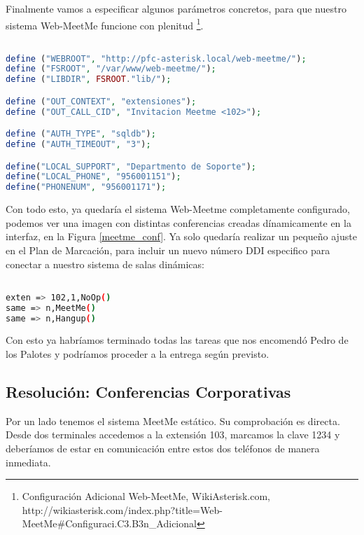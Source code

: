 Finalmente vamos a especificar algunos parámetros concretos, para que nuestro sistema Web-MeetMe funcione con plenitud \footnote{Configuración Adicional Web-MeetMe, WikiAsterisk.com, \\ http://wikiasterisk.com/index.php?title=Web-MeetMe\#Configuraci.C3.B3n\_Adicional}.

\begin{lstlisting}[language=php,title={/var/www/web-meetme/lib/defines.php}]

define ("WEBROOT", "http://pfc-asterisk.local/web-meetme/");
define ("FSROOT", "/var/www/web-meetme/");
define ("LIBDIR", FSROOT."lib/");

define ("OUT_CONTEXT", "extensiones");
define ("OUT_CALL_CID", "Invitacion Meetme <102>");

define ("AUTH_TYPE", "sqldb");
define ("AUTH_TIMEOUT", "3");

define("LOCAL_SUPPORT", "Departmento de Soporte");
define("LOCAL_PHONE", "956001151");
define("PHONENUM", "956001171");

\end{lstlisting}

Con todo esto, ya quedaría el sistema Web-Meetme completamente configurado, podemos ver una imagen con distintas conferencias creadas dínamicamente en la interfaz, en la Figura \ref{meetme_conf}. Ya solo quedaría realizar un pequeño ajuste en el Plan de Marcación, para incluir un nuevo número DDI especifico para conectar a nuestro sistema de salas dinámicas:


\begin{lstlisting}[language=bash,title={/etc/asterisk/extensions.conf}]

exten => 102,1,NoOp()
same => n,MeetMe()
same => n,Hangup()

\end{lstlisting}

Con esto ya habríamos terminado todas las tareas que nos encomendó Pedro de los Palotes y podríamos proceder a la entrega según previsto.

\subsection{Resolución: Conferencias Corporativas}

Por un lado tenemos el sistema MeetMe estático. Su comprobación es directa. Desde dos terminales accedemos a la extensión 103, marcamos la clave 1234 y deberíamos de estar en comunicación entre estos dos teléfonos de manera inmediata. 

